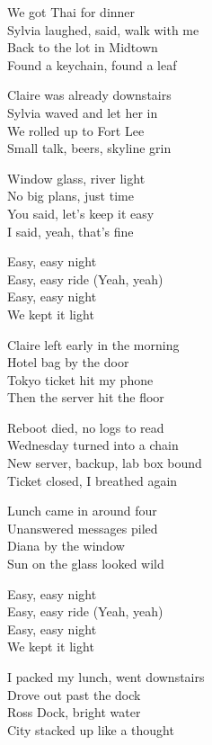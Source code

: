\begin{lyrics}
We got Thai for dinner\\
Sylvia laughed, said, walk with me\\
Back to the lot in Midtown\\
Found a keychain, found a leaf

Claire was already downstairs\\
Sylvia waved and let her in\\
We rolled up to Fort Lee\\
Small talk, beers, skyline grin

Window glass, river light\\
No big plans, just time\\
You said, let's keep it easy\\
I said, yeah, that's fine

Easy, easy night\\
Easy, easy ride
(Yeah, yeah)\\
Easy, easy night\\
We kept it light

Claire left early in the morning\\
Hotel bag by the door\\
Tokyo ticket hit my phone\\
Then the server hit the floor

Reboot died, no logs to read\\
Wednesday turned into a chain\\
New server, backup, lab box bound\\
Ticket closed, I breathed again

Lunch came in around four\\
Unanswered messages piled\\
Diana by the window\\
Sun on the glass looked wild

Easy, easy night\\
Easy, easy ride
(Yeah, yeah)\\
Easy, easy night\\
We kept it light

I packed my lunch, went downstairs\\
Drove out past the dock\\
Ross Dock, bright water\\
City stacked up like a thought


\end{lyrics}
